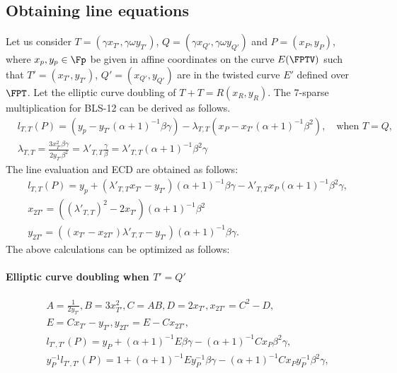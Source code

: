 \subsection*{Obtaining line equations}
Let us consider  $T=(\gamma x_{T'},\gamma \omega y_{T'})$, $Q=(\gamma x_{Q'}, \gamma \omega y_{Q'})$  and  $P=(x_P,y_P) $, where $x_p, y_p \in \Fp$ be given in affine coordinates on the curve $E(\FPTV)$ such that $T'=(x_{T'},y_{T'})$, $Q'=(x_{Q'},y_{Q'})$ are in the twisted curve $E'$ defined over $\FPT$.
Let the elliptic curve doubling of $T+T = R(x_R, y_R)$. 
 The 7-sparse multiplication for BLS-12 can be derived as follows.
\begin{eqnarray}
 & l_{T,T}(P) = (y_p-y_{T'} (\alpha+1)^{-1}\beta\gamma)- \lambda_{T,T}(x_P-x_{T'}(\alpha+1)^{-1}\beta^2),   \quad \text{when $T = Q$,}  \nonumber\\
 &\lambda_{T,T}= \frac{ 3x_{T'}^2 \beta\gamma}{2 y_{T'} \beta^2}  = \lambda'_{T,T} \frac{\gamma}{\beta}= \lambda'_{T,T}(\alpha+1)^{-1}\beta^2\gamma
\end{eqnarray}
The line evaluation and ECD are obtained as follows:
\begin{eqnarray}
& l_{T,T}(P) = y_p+ (\lambda'_{T,T}x_{T'}- y_{T'})(\alpha+1)^{-1}\beta\gamma-\lambda'_{T,T}x_{P}(\alpha+1)^{-1}\beta^2\gamma, \nonumber \\
 & x_{2T'} = ((\lambda'_{T,T})^2  - 2x_{T'})(\alpha+1)^{-1}\beta^2 \nonumber \\
 & y_{2T'}= ((x_{T'}-x_{2T'})\lambda'_{T,T}-y_{T'})(\alpha+1)^{-1}\beta\gamma \nonumber.
\end{eqnarray}
The above calculations can be optimized as follows:
\paragraph*{Elliptic curve doubling when $T'=Q'$}
\begin{subequations}
\begin{eqnarray}
&A=\frac{1}{2y_{T'}}, B=3x_{T'}^2, C=AB, D=2x_{T'}, x_{2T'}=C^2-D,\nonumber\\
& E= Cx_{T'}-y_{T'}, y_{2T'}=E-Cx_{2T'},\nonumber\\
&l_{T',T'}(P)= y_P+(\alpha+1)^{-1}E\beta\gamma-(\alpha+1)^{-1}Cx_P\beta^2 \gamma, \label{sparse_dbl_bn_1} \\
&y_{P}^{-1}l_{T',T'}(P)= 1+(\alpha+1)^{-1}Ey_{P}^{-1}\beta\gamma-(\alpha+1)^{-1}Cx_Py_{P}^{-1}\beta^2 \gamma, \label{sparse_dbl_bn_2}
\end{eqnarray}
\end{subequations}

